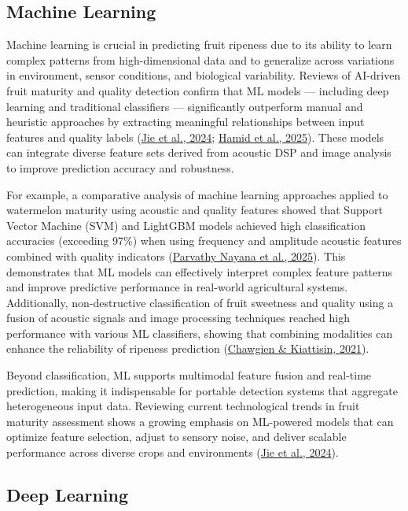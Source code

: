 \begin{thesisprose}
\subsection{Machine Learning}

Machine learning is crucial in predicting fruit ripeness due to its ability to learn complex patterns from high-dimensional data and to generalize across variations in environment, sensor conditions, and biological variability. Reviews of AI-driven fruit maturity and quality detection confirm that ML models — including deep learning and traditional classifiers — significantly outperform manual and heuristic approaches by extracting meaningful relationships between input features and quality labels (\hyperlink{cite.jie2024}{Jie et al., 2024}; \hyperlink{cite.hamid2025}{Hamid et al., 2025}). These models can integrate diverse feature sets derived from acoustic DSP and image analysis to improve prediction accuracy and robustness.

For example, a comparative analysis of machine learning approaches applied to watermelon maturity using acoustic and quality features showed that Support Vector Machine (SVM) and LightGBM models achieved high classification accuracies (exceeding 97\%) when using frequency and amplitude acoustic features combined with quality indicators (\hyperlink{cite.parvathynayana2025}{Parvathy Nayana et al., 2025}). This demonstrates that ML models can effectively interpret complex feature patterns and improve predictive performance in real-world agricultural systems. Additionally, non-destructive classification of fruit sweetness and quality using a fusion of acoustic signals and image processing techniques reached high performance with various ML classifiers, showing that combining modalities can enhance the reliability of ripeness prediction (\hyperlink{cite.chawgien2021}{Chawgien \& Kiattisin, 2021}).

Beyond classification, ML supports multimodal feature fusion and real-time prediction, making it indispensable for portable detection systems that aggregate heterogeneous input data. Reviewing current technological trends in fruit maturity assessment shows a growing emphasis on ML-powered models that can optimize feature selection, adjust to sensory noise, and deliver scalable performance across diverse crops and environments (\hyperlink{cite.jie2024}{Jie et al., 2024}).

\subsection{Deep Learning}


\end{thesisprose}
